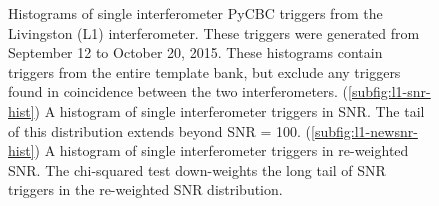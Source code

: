 \begin{figure}[!ht]%
\centering


  \caption[PyCBC SNR and re-weighted SNR histograms]{Histograms of single interferometer PyCBC %
           triggers from the Livingston (L1) interferometer. %
           These triggers were generated from September 12 to October 20, 2015. These histograms %
           contain triggers from the entire template bank, but %
           exclude any triggers found in coincidence between the two interferometers. %
           (\ref{subfig:l1-snr-hist}) A histogram of single interferometer triggers in SNR. %
           The tail of this distribution extends beyond SNR = 100. %
           (\ref{subfig:l1-newsnr-hist}) A histogram of single interferometer triggers in re-weighted SNR. %
           The chi-squared test down-weights the long tail of SNR triggers %
           in the re-weighted SNR distribution.}
  \label{fig:cbc-newsnr-histograms}
\end{figure}

